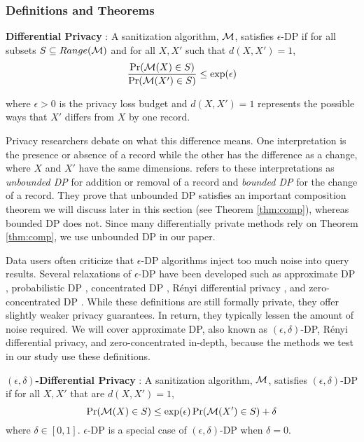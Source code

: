 \subsubsection{Definitions and Theorems}\label{subsec:def}
\begin{defn}\label{def:dp} \textbf{Differential Privacy} \citep{dwork2006calibrating}:
A sanitization algorithm, $\mathcal{M}$, satisfies $\epsilon$-DP if for all subsets $S\subseteq Range(\mathcal{M})$ and for all $X,X'$ such that $d(X,X')=1$, 
    \begin{equation}\label{eqn:dp}
        \frac{\Pr(\mathcal{M}( X) \in S)}{ \Pr(\mathcal{M}( X')\in S)}\le \exp(\epsilon)
    \end{equation}
\end{defn}
\noindent where $\epsilon>0$ is the privacy loss budget and $d(X,X')=1$ represents the possible ways that $X'$ differs from $X$ by one record.

Privacy researchers debate on what this difference means. One interpretation is the presence or absence of a record while the other has the difference as a change, where $X$ and $X'$ have the same dimensions. \citet{li2016differential} refers to these interpretations as \textit{unbounded DP} for addition or removal of a record and \textit{bounded DP} for the change of a record. They prove that unbounded DP satisfies an important composition theorem we will discuss later in this section (see Theorem \ref{thm:comp}), whereas bounded DP does not. Since many differentially private methods rely on Theorem \ref{thm:comp}, we use unbounded DP in our paper.

Data users often criticize that $\epsilon$-DP algorithms inject too much noise into query results. Several relaxations of $\epsilon$-DP have been developed such as approximate DP \citep{dwork2006our}, probabilistic DP \citep{machanavajjhala2008privacy}, concentrated DP \citep{dwork2016concentrated}, R\'enyi differential privacy \citep{mironov2017renyi}, and zero-concentrated DP \citep{bun2016concentrated}. While these definitions are still formally private, they offer slightly weaker privacy guarantees. In return, they typically lessen the amount of noise required. We will cover approximate DP, also known as $(\epsilon, \delta)$-DP, R\'enyi differential privacy, and zero-concentrated in-depth, because the methods we test in our study use these definitions.

\begin{defn}\label{def:adp} \textbf{$(\epsilon, \delta)$-Differential Privacy} \citep{dwork2006our}:
A sanitization algorithm, $\mathcal{M}$, satisfies $(\epsilon, \delta)$-DP if for all $X, X'$ that are $d(X,X')=1$,
    \begin{equation}\label{eqn:adp}
        \Pr(\mathcal{M}( X) \in S)\le \exp(\epsilon) \Pr(\mathcal{M}( X')\in S) + \delta
    \end{equation}
    where $\delta\in [0,1]$. $\epsilon$-DP is a special case of $(\epsilon, \delta)$-DP when $\delta=0$.
\end{defn}

